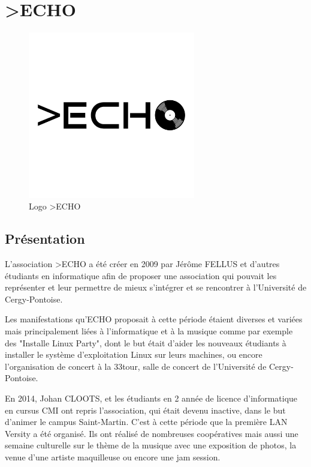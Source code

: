 \chapter{>ECHO}


\label{chap:entreprise}
\begin{figure}[h]
    \centering
    \includegraphics[width=0.65\textwidth]{images/logo_echo.png}
    \caption{Logo >ECHO}
\end{figure}
\section{Présentation}

    L'association >ECHO a été créer en 2009 par Jérôme FELLUS et d'autres étudiants en informatique afin de proposer une association qui pouvait les représenter et leur permettre de mieux s'intégrer et se rencontrer à l'Université de Cergy-Pontoise.
    
    Les manifestations qu'ECHO proposait à cette période étaient diverses et variées mais principalement liées à l'informatique et à la musique comme par exemple des "Installe Linux Party", dont le but était d'aider les nouveaux étudiants à installer le système d'exploitation Linux sur leurs machines, ou encore l'organisation de concert à la 33tour, salle de concert de l'Université de Cergy-Pontoise.
    
    En 2014, Johan CLOOTS, et les étudiants en 2 année de licence d'informatique en cursus CMI ont repris l'association, qui était devenu inactive, dans le but d'animer le campus Saint-Martin. C'est à cette période que la première LAN Versity a été organisé. Ils ont réalisé de nombreuses coopératives mais aussi une semaine culturelle sur le thème de la musique avec une exposition de photos, la venue d'une artiste maquilleuse ou encore une jam session.
    
